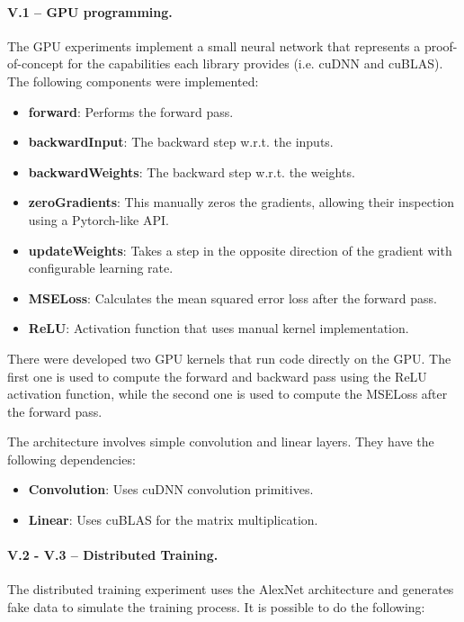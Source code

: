 \paragraph{V.1 -- GPU programming.}
The GPU experiments implement a small neural network that represents a proof-of-concept for the
capabilities each library provides (i.e. cuDNN and cuBLAS). The following components were
implemented:

\begin{itemize}
	\item \textbf{forward}: Performs the forward pass.
	\item \textbf{backwardInput}: The backward step w.r.t. the inputs.
	\item \textbf{backwardWeights}: The backward step w.r.t. the weights.
	\item \textbf{zeroGradients}: This manually zeros the gradients, allowing their inspection using a Pytorch-like API.
	\item \textbf{updateWeights}: Takes a step in the opposite direction of the gradient with configurable learning rate.
	\item \textbf{MSELoss}: Calculates the mean squared error loss after the forward pass.
	\item \textbf{ReLU}: Activation function that uses manual kernel implementation.
\end{itemize}

There were developed two GPU kernels that run code directly on the GPU. The first one is used to
compute the forward and backward pass using the ReLU activation function, while the second one is
used to compute the MSELoss after the forward pass.

The architecture involves simple convolution and linear layers. They have the following
dependencies:
\begin{itemize}
	\item \textbf{Convolution}: Uses cuDNN convolution primitives.
	\item \textbf{Linear}: Uses cuBLAS for the matrix multiplication.
\end{itemize}

\paragraph{V.2 - V.3 -- Distributed Training.}
The distributed training experiment uses the AlexNet architecture \cite{krizhevsky_imagenet_2012}
and generates fake data to simulate the training process. It is possible to do the following:

